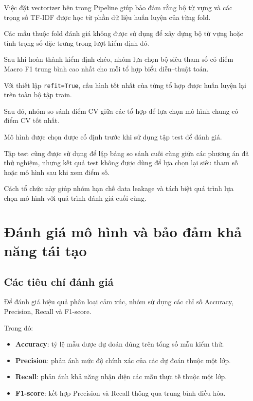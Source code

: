 Việc đặt vectorizer bên trong Pipeline giúp bảo đảm rằng bộ từ vựng và các trọng số TF-IDF được học từ phần dữ liệu huấn luyện của từng fold.

Các mẫu thuộc fold đánh giá không được sử dụng để xây dựng bộ từ vựng hoặc tính trọng số đặc trưng trong lượt kiểm định đó.

Sau khi hoàn thành kiểm định chéo, nhóm lựa chọn bộ siêu tham số có điểm Macro F1 trung bình cao nhất cho mỗi tổ hợp biểu diễn--thuật toán.

Với thiết lập \texttt{refit=True}, cấu hình tốt nhất của từng tổ hợp được huấn luyện lại trên toàn bộ tập train.

Sau đó, nhóm so sánh điểm CV giữa các tổ hợp để lựa chọn mô hình chung có điểm CV tốt nhất.

Mô hình được chọn được cố định trước khi sử dụng tập test để đánh giá.

Tập test cũng được sử dụng để lập bảng so sánh cuối cùng giữa các phương án đã thử nghiệm, nhưng kết quả test không được dùng để lựa chọn lại siêu tham số hoặc mô hình sau khi xem điểm số.

Cách tổ chức này giúp nhóm hạn chế data leakage và tách biệt quá trình lựa chọn mô hình với quá trình đánh giá cuối cùng.



\section{Đánh giá mô hình và bảo đảm khả năng tái tạo}

\subsection{Các tiêu chí đánh giá}

Để đánh giá hiệu quả phân loại cảm xúc, nhóm sử dụng các chỉ số Accuracy, Precision, Recall và F1-score.

Trong đó:

\begin{itemize}
    \item \textbf{Accuracy}: tỷ lệ mẫu được dự đoán đúng trên tổng số mẫu kiểm thử.

    \item \textbf{Precision}: phản ánh mức độ chính xác của các dự đoán thuộc một lớp.

    \item \textbf{Recall}: phản ánh khả năng nhận diện các mẫu thực tế thuộc một lớp.

    \item \textbf{F1-score}: kết hợp Precision và Recall thông qua trung bình điều hòa.
\end{itemize}

